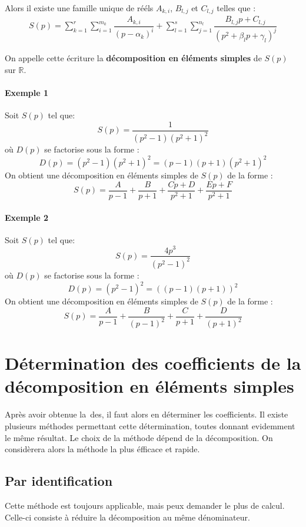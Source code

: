 Alors il existe une famille unique de rééls $A_{k,i}$, $B_{l,j}$ et $C_{l,j}$ telles que :
\begin{align}
S(p)=\sum_{k=1}^r\sum_{i=1}^{m_k} \dfrac{A_{k,i}}{\left(p-\alpha_k\right)^i}+\sum_{l=1}^s\sum_{j=1}^{n_l} \dfrac{B_{l,j}p+C_{l,j}}{\left(p^2+\beta_lp+\gamma_l\right)^j}
\end{align}

On appelle cette écriture la \textbf{décomposition en éléments simples} de $S(p)$ sur $\mathbb{R}$.

\paragraph{Exemple 1}
Soit $S(p)$ tel que:
$$
S(p)=\dfrac{1}{(p^2-1)(p^2+1)^2}
$$
où $D(p)$ se factorise sous la forme :
$$
D(p)=(p^2-1)(p^2+1)^2=(p-1)(p+1)(p^2+1)^2
$$
On obtient une décomposition en éléments simples de $S(p)$ de la forme :
$$
S(p)=\dfrac{A}{p-1}+\dfrac{B}{p+1}+\dfrac{Cp+D}{p^2+1}+\dfrac{Ep+F}{p^2+1}
$$

\paragraph{Exemple 2}
Soit $S(p)$ tel que:
$$
S(p)=\dfrac{4p^3}{(p^2-1)^2}
$$
où $D(p)$ se factorise sous la forme :
$$
D(p)=(p^2-1)^2=\left((p-1)(p+1)\right)^2
$$
On obtient une décomposition en éléments simples de $S(p)$ de la forme :
$$
S(p)=\dfrac{A}{p-1}+\dfrac{B}{(p-1)^2}+\dfrac{C}{p+1}+\dfrac{D}{(p+1)^2}
$$
\section[Détermination des coefficients de la DES]{Détermination des coefficients de la décomposition en éléments simples}
Après avoir obtenue la~\gls{des}, il faut alors en déterminer les coefficients. Il existe plusieurs
méthodes permettant cette détermination, toutes donnant evidemment le même résultat. Le choix 
de la méthode dépend de la décomposition. On considèrera alors la méthode la plus éfficace et rapide.

\subsection{Par identification}
Cette méthode est toujours applicable, mais peux demander le plus de calcul. Celle-ci consiste à réduire
la décomposition au même dénominateur.


